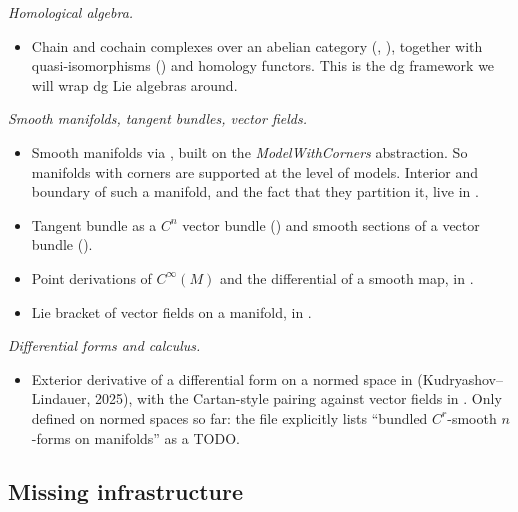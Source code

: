 \documentclass[11pt,a4paper]{article}
\theoremstyle{definition}
\newcommand{\Cinfty}{C^{\infty}}
\begin{document}
\emph{Homological algebra.}
\begin{itemize}[leftmargin=2em]
  \item Chain and cochain complexes over an abelian category
        (,
        ), together
        with quasi-isomorphisms
        () and homology
        functors. This is the dg framework we will wrap dg Lie
        algebras around.
\end{itemize}

\emph{Smooth manifolds, tangent bundles, vector fields.}
\begin{itemize}[leftmargin=2em]
  \item Smooth manifolds via
        , built on
        the \emph{ModelWithCorners} abstraction. So manifolds with
        corners are supported at the level of models. Interior and
        boundary of such a manifold, and the fact that they partition
        it, live in
        .
  \item Tangent bundle as a $C^{n}$ vector bundle
        ()
        and smooth sections of a vector bundle
        ().
  \item Point derivations of $\Cinfty(M)$ and the differential of a
        smooth map, in
        .
  \item Lie bracket of vector fields on a manifold, in
        .
\end{itemize}

\emph{Differential forms and calculus.}
\begin{itemize}[leftmargin=2em]
  \item Exterior derivative of a differential form on a normed space
        in 
        (Kudryashov--Lindauer, 2025), with the Cartan-style pairing
        against vector fields in .
        Only defined on normed spaces so far: the file explicitly
        lists ``bundled $C^{r}$-smooth $n$-forms on manifolds'' as a
        TODO.
\end{itemize}

\subsection{Missing infrastructure}\label{ssec:missing}
\end{document}
